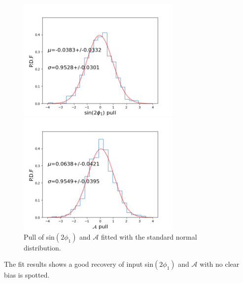 \begin{figure}[H]
	\begin{minipage}{0.5\linewidth}
		\includegraphics[height=6cm]{figures/pull_hist_S}
	\end{minipage}
	\begin{minipage}{0.5\linewidth}
		\includegraphics[height=6cm]{figures/pull_hist_A}
	\end{minipage}
	\caption{Pull of sin$(2\phi_1)$ and $\mathcal{A}$ fitted with the standard normal distribution.}
\end{figure}

The fit results shows a good recovery of input sin$(2\phi_1)$ and $\mathcal{A}$ with no clear bias is spotted.


